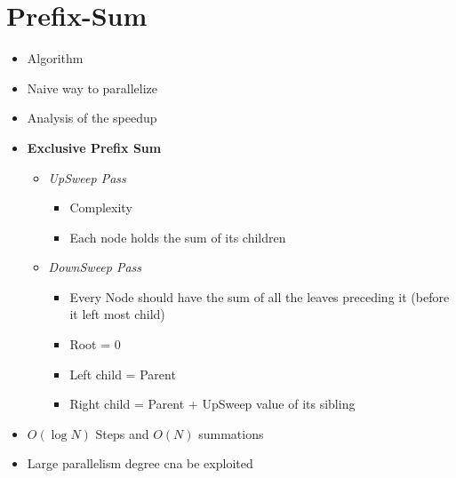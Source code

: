 \documentclass[12pt,oneside]{report}
\begin{document}
\section{Prefix-Sum}
\begin{itemize}
    \item Algorithm
    \item Naive way to parallelize
    \item Analysis of the speedup
    \item \textbf{Exclusive Prefix Sum}
    \begin{itemize}
        \item \textit{UpSweep Pass}
        \begin{itemize}
            \item Complexity
            \item Each node holds the sum of its children
        \end{itemize}
        \item \textit{DownSweep Pass}
        \begin{itemize}
            \item Every Node should have the sum of all the leaves preceding it (before it left most child)
            \item Root = 0
            \item Left child = Parent
            \item Right child = Parent + UpSweep value of its sibling
        \end{itemize}
    \end{itemize}
    \item \(O(\log N)\) Steps and \(O(N)\) summations
    \item Large parallelism degree cna be exploited
\end{itemize}
\end{document}
